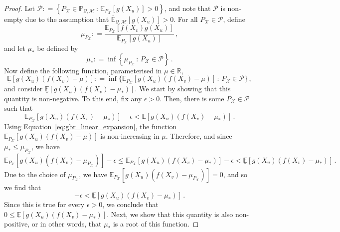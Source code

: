 \documentclass[3p]{elsarticle}
\newcommand{\reals}{\mathbb{R}}
\newcommand{\states}{\mathcal{X}}
\newcommand{\uexp}{\overline{\mathbb{E}}_{\rateset,\mathcal{M}}}
\newcommand{\rateset}{\mathcal{Q}}
\newcommand{\coloneqq}{:\!=}
\begin{document}
\begin{proof}
Let $\mathcal{P}\coloneqq \left\{ {P_\states}\in\mathbb{P}_{\rateset,\mathcal{M}}\,:\, \mathbb{E}_{P_\states}[g(X_u)] > 0\right\}$, and note that $\mathcal{P}$ is non-empty due to the assumption that $\uexp[g(X_u)]>0$. For all ${P_\states}\in\mathcal{P}$, define
\begin{equation*}
\mu_{P_\states} \coloneqq \frac{\mathbb{E}_{P_\states}[f(X_v)g(X_u)]}{\mathbb{E}_{P_\states}[g(X_u)]}\,,
\end{equation*}
and let $\mu_*$ be defined by
\begin{equation*}
\mu_* \coloneqq \inf\left\{\mu_{P_\states}\,:\,{P_\states}\in\mathcal{P} \right\}\,.
\end{equation*}
Now define the following function, parameterised in $\mu\in\reals$,
\begin{equation*}
\underline{\mathbb{E}}[g(X_u)(f(X_v) - \mu)] \coloneqq \inf\{\mathbb{E}_{P_\states}[g(X_u)(f(X_v) - \mu)]\,:\,{P_\states}\in\mathcal{P} \}\,,
\end{equation*}
and consider $\underline{\mathbb{E}}[g(X_u)(f(X_v) - \mu_*)]$. We start by showing that this quantity is non-negative. To this end, fix any $\epsilon>0$. Then, there is some ${P_\states}\in\mathcal{P}$ such that
\begin{equation*}
\mathbb{E}_{P_\states}[g(X_u)(f(X_v) - \mu_*)] - \epsilon < \underline{\mathbb{E}}[g(X_u)(f(X_v) - \mu_*)]\,.
\end{equation*}
Using Equation~\eqref{eq:gbr_linear_expansion}, the function $\mathbb{E}_{P_\states}[g(X_u)(f(X_v) - \mu)]$ is non-increasing in $\mu$. Therefore, and since $\mu_*\leq \mu_{P_\states}$, we have
\begin{equation*}
\mathbb{E}_{P_\states}[g(X_u)(f(X_v) - \mu_{P_\states})] - \epsilon \leq \mathbb{E}_{P_\states}[g(X_u)(f(X_v) - \mu_*)] - \epsilon < \underline{\mathbb{E}}[g(X_u)(f(X_v) - \mu_*)]\,.
\end{equation*}
Due to the choice of $\mu_{P_\states}$, we have $\mathbb{E}_{P_\states}[g(X_u)(f(X_v) - \mu_{P_\states})]=0$, and so we find that
\begin{equation*}
-\epsilon < \underline{\mathbb{E}}[g(X_u)(f(X_v) - \mu_*)]\,.
\end{equation*}
Since this is true for every $\epsilon>0$, we conclude that $0\leq \underline{\mathbb{E}}[g(X_u)(f(X_v) - \mu_*)]$. Next, we show that this quantity is also non-positive, or in other words, that $\mu_*$ is a root of this function. 


\end{proof}
\end{document}
